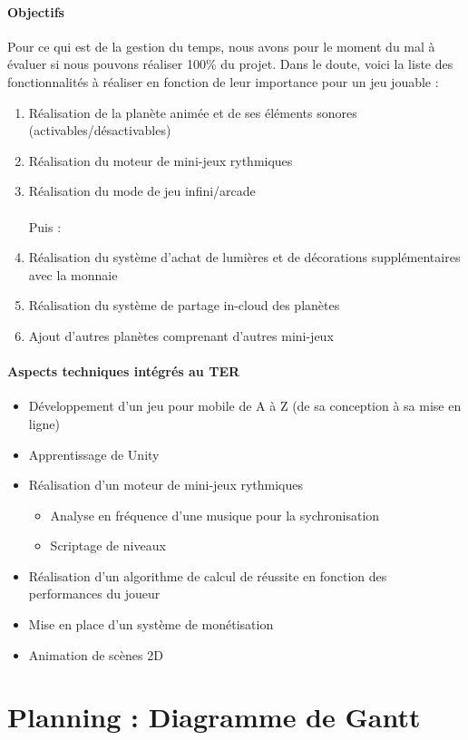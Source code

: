 \documentclass[a4paper,11pt]{article}
\begin{document}
\paragraph{Objectifs} Pour ce qui est de la gestion du temps, nous avons pour le moment du mal à évaluer si nous pouvons réaliser 100\% du projet. Dans le doute, voici la liste des fonctionnalités à réaliser en fonction de leur importance pour un jeu jouable :
\begin{enumerate}
\item Réalisation de la planète animée et de ses éléments sonores (activables/désactivables)
\item Réalisation du moteur de mini-jeux rythmiques
\item Réalisation du mode de jeu infini/arcade
\\\\Puis :
\item Réalisation du système d’achat de lumières et de décorations supplémentaires avec la monnaie
\item Réalisation du système de partage in-cloud des planètes
\item Ajout d’autres planètes comprenant d’autres mini-jeux
\end{enumerate}

\paragraph{Aspects techniques intégrés au TER}
\begin{itemize}
\item Développement d’un jeu pour mobile de A à Z (de sa conception à sa mise en ligne)
\item Apprentissage de Unity
\item Réalisation d’un moteur de mini-jeux rythmiques
\begin{itemize}
\item Analyse en fréquence d’une musique pour la sychronisation
\item Scriptage de niveaux
\end{itemize}
\item Réalisation d’un algorithme de calcul de réussite en fonction des performances du joueur
\item Mise en place d’un système de monétisation
\item Animation de scènes 2D
\end{itemize}

\section{Planning : Diagramme de Gantt}
\newpage

\end{document}
